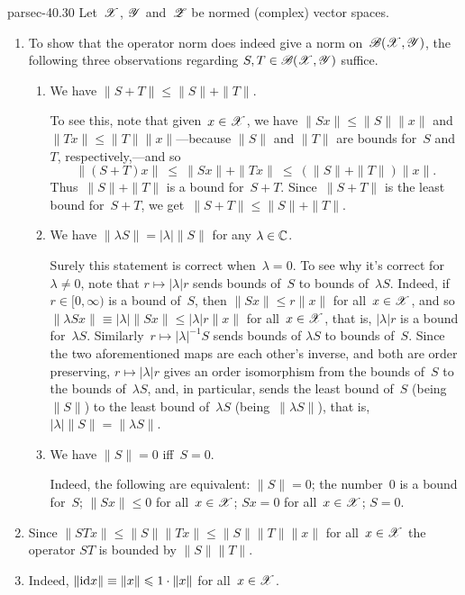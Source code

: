 \documentclass[b5page]{book}
\begin{document}
\begin{solution}{parsec-40.30}%
Let~$\mathscr{X}$, $\mathscr{Y}$ and~$\mathscr{Z}$ be normed (complex) vector spaces.
\begin{enumerate}
\item
To show that the operator norm does indeed
give a norm on~$\mathscr{B}(\mathscr{X},\mathscr{Y})$,
the following
three observations
regarding $S,T\in\mathscr{B}(\mathscr{X},\mathscr{Y})$
suffice.
\begin{enumerate}
\item
We have $\|S+T\|\leq \|S\|+\|T\|$.

To see this,
note that
given~$x\in \mathscr{X}$,
we have $\|Sx\|\leq \|S\|\|x\|$
and $\|Tx\|\leq \|T\|\|x\|$---because $\|S\|$ and $\|T\|$ are bounds
for~$S$ and~$T$, respectively,---and so 
\begin{equation*}
    \|(S+T)x\|
\ \leq\  \|Sx\|+\|Tx\|
\ \leq\  (\|S\|+\|T\|)\|x\|.
\end{equation*}
Thus~$\|S\|+\|T\|$ is a bound for~$S+T$.
Since~$\|S+T\|$ is the least bound for~$S+T$,
we get~$\|S+T\|\leq \|S\|+\|T\|$.

\item
We have
$\|\lambda S\|=\left|\lambda \right| \|S\|$
for any $\lambda \in \mathbb{C}$.

Surely this statement is correct when~$\lambda= 0$.
To see why it's correct for~$\lambda \neq 0$,
note that
$r\mapsto \left|\lambda\right| r$
sends bounds of~$S$ to bounds of~$\lambda S$.
Indeed,
if~$r\in[0,\infty)$ is a bound of~$S$,
then $\|Sx\|\leq r\|x\|$
for all~$x\in \mathscr{X}$,
and so~$\|\lambda Sx\| \equiv 
\left|\lambda \right|\|Sx\|\leq \left|\lambda\right| r \|x\|$
for all~$x\in\mathscr{X}$,
that is, $\left|\lambda\right|r$
is a bound for~$\lambda S$.
Similarly~$r\mapsto \left|\lambda\right|^{-1} S$
sends bounds of $\lambda S$
to bounds of~$S$.
Since the two aforementioned maps are each other's inverse,
and both are order preserving,
$r\mapsto \left|\lambda \right|r$
gives an order isomorphism from 
the bounds of~$S$ to the bounds of~$\lambda S$,
and, in particular,
    sends the least bound of~$S$ (being $\|S\|$)
to the least bound of~$\lambda S$
        (being~$\|\lambda S\|$),
that is,
$\left|\lambda\right|\|S\|=\|\lambda S\|$.
\item
We have $\|S\|=0$ iff~$S=0$.

Indeed, the following are equivalent:
$\|S\|=0$; the number~$0$ is a bound for~$S$;
$\|Sx\|\leq 0$ for all~$x\in\mathscr{X}$;
$Sx=0$ for all~$x\in\mathscr{X}$;
$S=0$.
\end{enumerate}
\item
Since $\|STx\|\leq \|S\| \|Tx\|
\leq \|S\|\|T\|\|x\|$
for all~$x\in \mathscr{X}$
the operator $ST$ is bounded by
$\|S\|\|T\|$.
\item
Indeed, $ \|\mathrm{id} x \|\equiv \|x\|\leqslant  1\cdot\|x\|$
for all~$x\in\mathscr{X}$.
\end{enumerate}
\end{solution}
\end{document}
